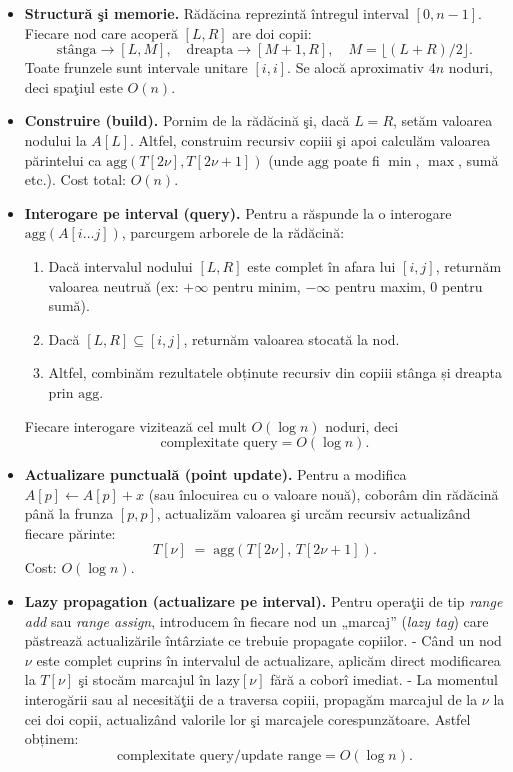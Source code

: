 \documentclass[11pt,a4paper]{article}
\theoremstyle{definition}
\theoremstyle{plain}
\theoremstyle{remark}
\begin{document}
\begin{itemize}
  \item \textbf{Structură şi memorie.}
    Rădăcina reprezintă întregul interval \([0,n-1]\). Fiecare nod care acoperă \([L,R]\) are doi copii:
    \[
      \text{stânga}\to[L,M],\quad
      \text{dreapta}\to[M+1,R],
      \quad M = \lfloor (L+R)/2\rfloor.
    \]
    Toate frunzele sunt intervale unitare \([i,i]\).
    Se alocă aproximativ \(4n\) noduri, deci spaţiul este \(O(n)\).

  \item \textbf{Construire (build).}
    Pornim de la rădăcină şi, dacă \(L=R\), setăm valoarea nodului la \(A[L]\). Altfel, construim recursiv copiii şi apoi calculăm valoarea părintelui ca
    \(\mathrm{agg}(T[2\nu],T[2\nu+1])\)
    (unde \(\mathrm{agg}\) poate fi \(\min\), \(\max\), sumă etc.).
    Cost total: \(O(n)\).

  \item \textbf{Interogare pe interval (query).}
    Pentru a răspunde la o interogare \(\mathrm{agg}(A[i\ldots j])\), parcurgem arborele de la rădăcină:
    \begin{enumerate}
      \item Dacă intervalul nodului \([L,R]\) este complet în afara lui \([i,j]\), returnăm valoarea neutruă (ex: \(+\infty\) pentru minim, \(-\infty\) pentru maxim, \(0\) pentru sumă).
      \item Dacă \([L,R]\subseteq[i,j]\), returnăm valoarea stocată la nod.
      \item Altfel, combinăm rezultatele obținute recursiv din copiii stânga și dreapta prin \(\mathrm{agg}\).
    \end{enumerate}
    Fiecare interogare vizitează cel mult \(O(\log n)\) noduri, deci
    \[
      \text{complexitate query} = O(\log n).
    \]

  \item \textbf{Actualizare punctuală (point update).}
    Pentru a modifica \(A[p]\leftarrow A[p]+x\) (sau înlocuirea cu o valoare nouă), coborâm din rădăcină până la frunza \([p,p]\), actualizăm valoarea şi urcăm recursiv actualizând fiecare părinte:
    \[
      T[\nu]\;=\;\mathrm{agg}(T[2\nu],\,T[2\nu+1]).
    \]
    Cost: \(O(\log n)\).

  \item \textbf{Lazy propagation (actualizare pe interval).}
    Pentru operaţii de tip \emph{range add} sau \emph{range assign}, introducem în fiecare nod un „marcaj” (\emph{lazy tag}) care păstrează actualizările întârziate ce trebuie propagate copiilor.
    - Când un nod \(\nu\) este complet cuprins în intervalul de actualizare, aplicăm direct modificarea la \(T[\nu]\) şi stocăm marcajul în \(\mathrm{lazy}[\nu]\) fără a coborî imediat.
    - La momentul interogării sau al necesităţii de a traversa copiii, propagăm marcajul de la \(\nu\) la cei doi copii, actualizând valorile lor şi marcajele corespunzătoare.
    Astfel obținem:
    \[
      \text{complexitate query/update range} = O(\log n).
    \]


\end{itemize}
\end{document}

